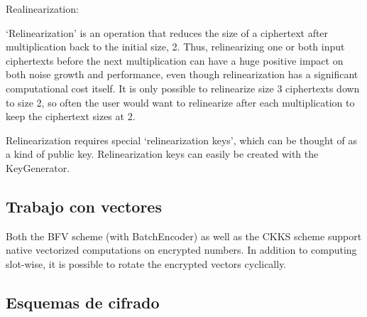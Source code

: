 Realinearization:

`Relinearization' is an operation that reduces the size of a ciphertext after
multiplication back to the initial size, 2. Thus, relinearizing one or both
input ciphertexts before the next multiplication can have a huge positive
impact on both noise growth and performance, even though relinearization has
a significant computational cost itself. It is only possible to relinearize
size 3 ciphertexts down to size 2, so often the user would want to relinearize
after each multiplication to keep the ciphertext sizes at 2.

Relinearization requires special `relinearization keys', which can be thought
of as a kind of public key. Relinearization keys can easily be created with
the KeyGenerator.


\subsection{Trabajo con vectores}

Both the BFV scheme (with BatchEncoder) as well as the CKKS scheme support native
vectorized computations on encrypted numbers. In addition to computing slot-wise,
it is possible to rotate the encrypted vectors cyclically.

\subsection{Esquemas de cifrado}


